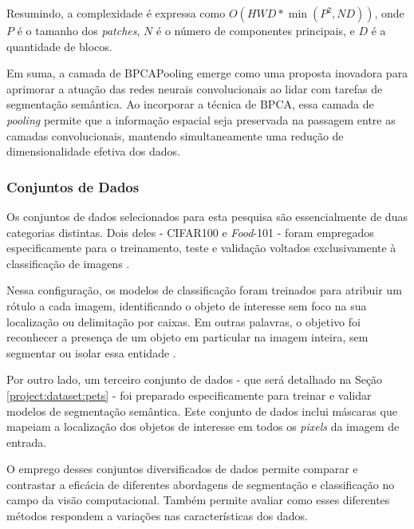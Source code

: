 Resumindo, a complexidade é expressa como $O(HWD * \min(P^2, ND))$, onde $P$ é o tamanho dos \textit{patches}, $N$ é o número de componentes principais, e $D$ é a quantidade de blocos.

Em suma, a camada de BPCAPooling emerge como uma proposta inovadora para aprimorar a atuação das redes neurais convolucionais ao lidar com tarefas de segmentação semântica. Ao incorporar a técnica de BPCA, essa camada de \textit{pooling} permite que a informação espacial seja preservada na passagem entre as camadas convolucionais, mantendo simultaneamente uma redução de dimensionalidade efetiva dos dados.%

\subsubsection{Conjuntos de Dados}
\label{project:dataset}
Os conjuntos de dados selecionados para esta pesquisa são essencialmente de duas categorias distintas. Dois deles - CIFAR100 e \textit{Food}-101 - foram empregados especificamente para o treinamento, teste e validação voltados exclusivamente à classificação de imagens \citep{Krizhevsky2009LearningImages, Bossard2014Food-101Forests}.

Nessa configuração, os modelos de classificação foram treinados para atribuir um rótulo a cada imagem, identificando o objeto de interesse sem foco na sua localização ou delimitação por caixas. Em outras palavras, o objetivo foi reconhecer a presença de um objeto em particular na imagem inteira, sem segmentar ou isolar essa entidade \citep{Viitaniemi2008TechniquesSegmentation}.

Por outro lado, um terceiro conjunto de dados - que será detalhado na Seção \ref{project:dataset:pets} - foi preparado especificamente para treinar e validar modelos de segmentação semântica. Este conjunto de dados inclui máscaras que mapeiam a localização dos objetos de interesse em todos os \textit{pixels} da imagem de entrada.

O emprego desses conjuntos diversificados de dados permite comparar e contrastar a eficácia de diferentes abordagens de segmentação e classificação no campo da visão computacional. Também permite avaliar como esses diferentes métodos respondem a variações nas características dos dados.


